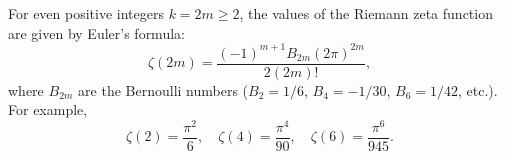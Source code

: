 For even positive integers $k = 2m \geq 2$, the values of the Riemann zeta function are given by Euler's formula:
$$
\zeta(2m) = \frac{(-1)^{m+1} B_{2m} (2\pi)^{2m}}{2(2m)!},
$$
where $B_{2m}$ are the Bernoulli numbers ($B_2 = 1/6$, $B_4 = -1/30$, $B_6 = 1/42$, etc.). For example,
$$
\zeta(2) = \frac{\pi^2}{6}, \quad \zeta(4) = \frac{\pi^4}{90}, \quad \zeta(6) = \frac{\pi^6}{945}.
$$
